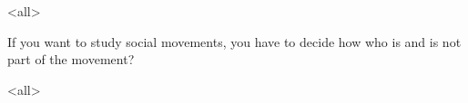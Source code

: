 \mode<all>{
}

If you want to study social movements, you have to decide how who is
and is not part of the movement?

\mode<all>{
}

